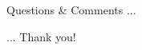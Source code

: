\documentclass[xcolor=x11names,compress]{beamer}
\renewcommand{\(}{\begin{columns}}
\renewcommand{\)}{\end{columns}}
\newcommand{\<}[1]{\begin{column}{#1}}
\renewcommand{\>}{\end{column}}
\newcommand{\0}{\V{0}}
\newcommand{\1}{\V{1}}
\begin{document}
\begin{frame}{}

{\LARGE \color{blue}
%
\vspace{0cm}Questions \& Comments ...\\
%



\vspace{5cm}
 \begin{flushright}... Thank you!\\\end{flushright}}
\end{frame}
\end{document}
